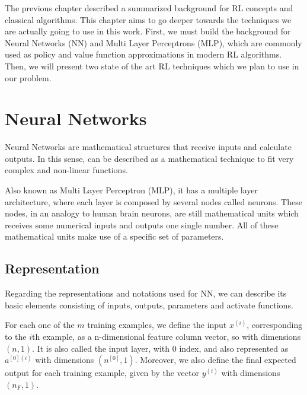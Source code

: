 
The previous chapter described a summarized background for RL concepts and classical algorithms. This chapter aims to go deeper towards the techniques we are actually going to use in this work. First, we must build the background for Neural Networks (NN) and Multi Layer Perceptrons (MLP), which are commonly used as policy and value function approximations in modern RL algorithms. Then, we will present two state of the art RL techniques which we plan to use in our problem.

\section{Neural Networks}

Neural Networks are mathematical structures that receive inputs and calculate outputs. In this sense, can be described as a mathematical technique to fit very complex and non-linear functions.

Also known as Multi Layer Perceptron (MLP), it has a multiple layer architecture, where each layer is composed by several nodes called neurons. These nodes, in an analogy to human brain neurons, are still mathematical units which receives some numerical inputs and outputs one single number. All of these mathematical units make use of a specific set of parameters.

\subsection{Representation}

Regarding the representations and notations used for NN, we can describe its basic elements consisting of inputs, outputs, parameters and activate functions.

For each one of the $m$ training examples, we define the input $x^{(i)}$, corresponding to the $i$th example, as a n-dimensional feature column vector, so with dimensions $(n,1)$. It is also called the input layer, with $0$ index, and also represented as $a^{[0](i)}$ with dimensions $(n^{[0]},1)$. Moreover, we also define the final expected output for each training example, given by the vector $y^{(i)}$ with dimensions $(n_F,1)$.

